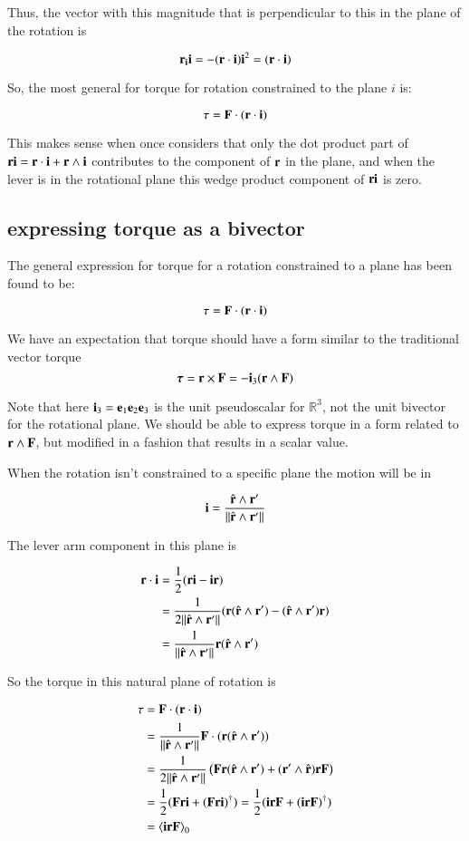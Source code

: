 \documentclass{article}      %
\newcommand{\bithree}[0]{{\Bi}_3}
\newcommand{\nrrp}[0]{\norm{\rcap \wedge \Br'}}
\begin{document}
Thus, the vector with this magnitude that is perpendicular to this in the plane of the rotation  is

\[
\mathbf{r} _{\mathbf{i} } \mathbf{i}  
=  -(\mathbf{r}  \cdot \mathbf{i} ) \mathbf{i} ^2
=  (\mathbf{r}  \cdot \mathbf{i} ) 
\]

So, the most general for torque for rotation constrained to the plane $i$ is:

\[
\tau
=  \mathbf{F}  \cdot (\mathbf{r}  \cdot \mathbf{i} ) 
\]

This makes sense when once considers that only the dot product part of $\mathbf{r}  \mathbf{i}  = \mathbf{r}  \cdot \mathbf{i}  + \mathbf{r}  \wedge \mathbf{i} $ contributes to the component of $\mathbf{r} $ in the plane, and when the lever is in the rotational plane this wedge product component of 
$\mathbf{r} \mathbf{i} $ is zero.

\subsection{expressing torque as a bivector}

The general expression for torque for a rotation constrained to a plane has been found to be:

\[
\tau
=  \mathbf{F}  \cdot (\mathbf{r}  \cdot \mathbf{i} ) 
\]

We have an expectation that torque should have a form similar to the traditional vector torque
\[
\Btau = \Br \times \BF = -\bithree (\Br \wedge \BF)
\]

Note that here $\bithree = \Be_1 \Be_2 \Be_3 $ is the unit pseudoscalar for $\mathbb{R}^3$, not the unit bivector for the rotational plane.
We should be able to express torque in a form related to $\mathbf{r} \wedge \mathbf{F}$, but modified
in a fashion that results in a scalar value.

When the rotation isn't constrained to a specific plane the motion will be in

\[
\Bi = \frac{\rcap \wedge \Br'}{\nrrp}
\]

The lever arm component in this plane is

\begin{align*}
\Br \cdot \Bi
   &= \frac{1}{2}           (\Br \Bi - \Bi \Br) \\
   &= \frac{1}{2\nrrp} (\Br (\rcap \wedge \Br') - (\rcap \wedge \Br') \Br) \\
   &= \frac{1}{\nrrp}   \Br (\rcap \wedge \Br') \\
\end{align*}

So the torque in this natural plane of rotation is

\begin{align*}
\tau 
   &=  \BF  \cdot (\Br  \cdot \Bi )  \\
   &=  \frac{1}{\nrrp}     \BF \cdot ( \Br (\rcap \wedge \Br') ) \\
   &=  \frac{1}{2 \nrrp} \left(    \BF \Br (\rcap \wedge \Br') + (\Br' \wedge \rcap) \Br \BF    \right)\\
   &=  \frac{1}{2} ( \BF \Br \Bi + (\BF \Br \Bi)^\dagger ) = \frac{1}{2} ( \Bi \Br \BF + (\Bi \Br \BF)^\dagger ) \\
   &=  {\langle \Bi \Br \BF \rangle}_0
\end{align*}
\end{document}
